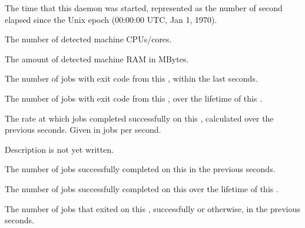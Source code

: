 \begin{description}

\item[\AdAttr{DaemonStartTime}:] The time that this daemon was
  started, represented as the number of second elapsed since
    the Unix epoch (00:00:00 UTC, Jan 1, 1970).

\item[\AdAttr{DetectedCpus}:] The number of detected machine CPUs/cores.

\item[\AdAttr{DetectedMemory}:] The amount of detected machine RAM in MBytes.

\item[\AdAttr{ExitCode<N>}:] The number of jobs with exit code
   from this ,
   within the last  seconds.

\item[\AdAttr{ExitCodeCumulative<N>}:] The number of jobs with exit 
  code  from this , over the lifetime of this
  .

\item[\AdAttr{JobCompletionRate}:] The rate at which jobs completed
  successfully on this , 
  calculated over the previous  seconds.
  Given in jobs per second.

\item[\AdAttr{JobQueueBirthdate}:] Description is not yet written.

\item[\AdAttr{JobsCompleted}:] The number of jobs successfully completed
  on this  in the previous  seconds.

\item[\AdAttr{JobsCompletedCumulative}:] The number of jobs 
  successfully completed on this  over the lifetime of this 
  .

\item[\AdAttr{JobsExited}:] The number of jobs that exited
  on this , successfully or otherwise, in the 
  previous  seconds.


\end{description}
